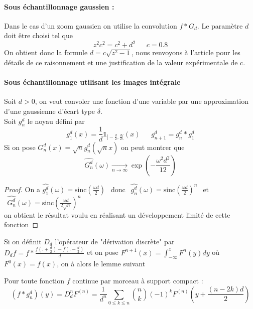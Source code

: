 \paragraph{Sous échantillonnage gaussien :}
Dans le cas d'un zoom gaussien on utilise la convolution $f*G_{d}$. Le paramètre $d$ doit être choisi tel que 
\begin{equation*}
z^2 c^2=c^2 + d^2     ~~~~~~~c= 0.8
\end{equation*}
On obtient donc la formule $d=c\sqrt{z^2 - 1}$, nous renvoyons à l'article \cite{morel2011sift} pour les détails de ce raisonnement et une justification de la valeur expérimentale de c.\\

\paragraph{Sous échantillonnage utilisant les images intégrale }
Soit $d>0$, on veut convoler une fonction d'une variable par une approximation d'une gaussienne d'écart type $\delta$.\\
Soit $g_n^d$ le noyau défini par 
\begin{equation*}
g_1^d(x)=\frac{1}{d}\mathds{1}_{]-\frac{d}{2},\frac{d}{2}[}(x) ~~~~~~~g_{n+1}^d= g_n^d * g_1^d
\end{equation*}
Si on pose $G_n^d(x)=\sqrt{n}g_n^d(\sqrt{n} x)$ on peut montrer que 
\begin{equation*}
\widehat{G_n^d}(\omega)\underset{n\rightarrow\infty}{\rightarrow} \exp\left(-\frac{\omega^2 d^2}{12}\right)
\end{equation*}
\begin{proof}
On a $\widehat{g_1^d}(\omega)=\text{sinc}\left(\frac{\omega d}{2}\right)~~$  donc $~~\widehat{g_n^d}(\omega)=\text{sinc}\left(\frac{\omega d}{2}\right)^n~~$ et 
$~~\widehat{G_n^d}(\omega)=\text{sinc}\left(\frac{\omega d}{2\sqrt{n}}\right)^n~~$\\
on obtient le résultat voulu en réalisant un développement limité de cette fonction 
\end{proof}
Si on définit $D_d$ l'opérateur de "dérivation discrète" par $D_d f=f*\frac{f(.+\frac{d}{2})-f(.-\frac{d}{2})}{d}$ et on pose $F^{n+1}(x)= \int_{-\infty}^{x}F^{n}(y)dy$ où $F^{0}(x)= f(x)$, on à alors le lemme suivant 
\begin{prop} Pour toute fonction $f$ continue par morceau à support compact :
\begin{equation*}
(f*g_n^d)(y)=D_d ^n F^{(n)}= \frac{1}{d^n}\underset{0 \le k\le n}{\sum} \binom{n}{k}(-1)^{k} F^{(n)}(y+\frac{(n-2k)d}{2})
\end{equation*}
\end{prop}
